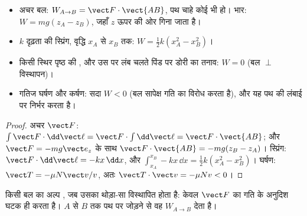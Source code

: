 \begin{proposition}[जिन कार्यों से सामना होता है]\label{prop:b1:work-and-energy:works}
\begin{itemize}
  \item अचर बल: $W_{A\to B} = \vect F\cdot\vect{AB}$, पथ चाहे कोई भी हो।
        भार: $W = mg(z_A - z_B)$, जहाँ $z$ ऊपर की ओर गिना जाता है।
  \item $k$ दृढ़ता की स्प्रिंग, वृद्धि $x_A$ से $x_B$ तक:
        $W = \tfrac12 k(x_A^2 - x_B^2)$।
  \item किसी स्थिर पृष्ठ की , और उस पर लंब चलते पिंड पर
        डोरी का तनाव: $W = 0$ (बल $\perp$ विस्थापन)।
  \item गतिज घर्षण और कर्षण: सदा $W < 0$ (बल सापेक्ष गति का विरोध करता है),
        और यह पथ की लंबाई पर निर्भर करता है।
\end{itemize}
\end{proposition}

\begin{proof}
अचर $\vect F$: $\int\vect F\cdot\dd\vect\ell = \vect F\cdot\int\dd\vect\ell
= \vect F\cdot\vect{AB}$; और $\vect F = -mg\vect e_z$ के साथ $\vect F\cdot\vect{AB}
= -mg(z_B - z_A)$। स्प्रिंग: $\vect F\cdot\dd\vect\ell = -kx\,\dd x$, और
$\int_{x_A}^{x_B}-kx\,\dd x = \tfrac12 k(x_A^2 - x_B^2)$। घर्षण: $\vect T
= -\mu N\vect v/v$, अतः $\vect T\cdot\vect v = -\mu Nv < 0$।
\end{proof}

\begin{omfigure}

{\small किसी बल का अल्प , जब उसका  थोड़ा-सा विस्थापित होता
है: केवल $\vect F$ का गति के अनुदिश घटक ही  करता है। $A$ से $B$ तक पथ
पर जोड़ने से वह $W_{A\to B}$ देता है।}
\end{omfigure}

